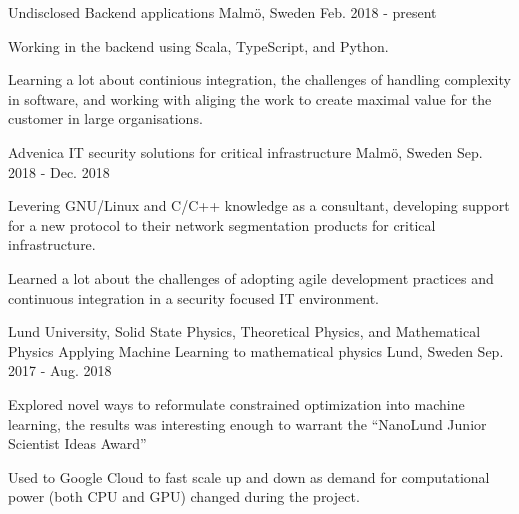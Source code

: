 


\begin{cventries}


\cventry
{Undisclosed} %
{Backend applications} %
{Malmö, Sweden} %
{Feb. 2018 - present} %
{ %
\begin{cvitems}
\item {Working in the backend using Scala, TypeScript, and Python.}
\item {Learning a lot about continious integration, the challenges
of handling complexity in software, and working with aliging the work to
create maximal value for the customer in large organisations.}
\end{cvitems}
}


\cventry
{Advenica} %
{IT security solutions for critical infrastructure} %
{Malmö, Sweden} %
{Sep. 2018 - Dec. 2018} %
{ %
\begin{cvitems}
\item {Levering GNU/Linux and C/C++ knowledge as a consultant, developing support for a new protocol to their network segmentation products for critical infrastructure.}
\item {Learned a lot about the challenges of adopting agile development practices and continuous
integration in a security focused IT environment.}
\end{cvitems}
}

\cventry
{Lund University, Solid State Physics, Theoretical Physics, and Mathematical Physics} %
{Applying Machine Learning to mathematical physics } %
{Lund, Sweden} %
{Sep. 2017 - Aug. 2018} %
{ %
\begin{cvitems}
\item {Explored novel ways to reformulate constrained optimization into
machine learning, the results was interesting enough to warrant the ``NanoLund Junior Scientist Ideas Award''}
\item {Used to Google Cloud to fast scale up and down as demand for
computational power (both CPU and GPU) changed during the project.}
\end{cvitems}
}


\end{cventries}
